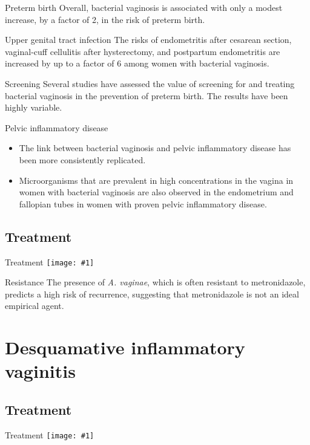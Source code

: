\documentclass{beamer}
\newcommand*{\solo}[1]{\centering\texttt{[image: \#1]}}
\begin{document}
\begin{frame}{Preterm birth}
    Overall, bacterial vaginosis is associated with only a modest increase, by
    a factor of 2, in the risk of preterm birth.
\end{frame}

\begin{frame}{Upper genital tract infection}
    The risks of endometritis after cesarean section, vaginal-cuff cellulitis
    after hysterectomy, and postpartum endometritis are increased by up to a
    factor of 6 among women with bacterial vaginosis.
\end{frame}

\begin{frame}{Screening}
    Several studies have assessed the value of screening for and treating
    bacterial vaginosis in the prevention of preterm birth. The results have
    been highly variable.
\end{frame}

\begin{frame}{Pelvic inflammatory disease}
    \begin{itemize}
        \item The link between bacterial vaginosis and pelvic inflammatory
              disease has been more consistently replicated.
        \item Microorganisms that are prevalent in high concentrations in the
              vagina in women with bacterial vaginosis are also observed in the
              endometrium and fallopian tubes in women with proven pelvic
              inflammatory disease.
    \end{itemize}
\end{frame}

\subsection{Treatment}
\begin{frame}{Treatment}
    \solo{T2.eps}
\end{frame}

\begin{frame}{Resistance}
    The presence of \textit{A. vaginae}, which is often resistant to
    metronidazole, predicts a high risk of recurrence, suggesting that
    metronidazole is not an ideal empirical agent.
\end{frame}

\section{Desquamative inflammatory vaginitis}
\subsection{Treatment}
\begin{frame}{Treatment}
    \solo{T3.eps}
\end{frame}
\end{document}
